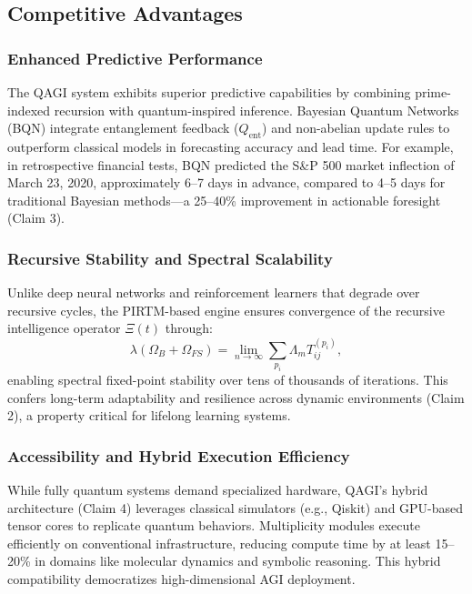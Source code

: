 \documentclass{article}
\theoremstyle{plain}
\theoremstyle{claimstyle}
\begin{document}
\subsection{Competitive Advantages}

\subsubsection{Enhanced Predictive Performance}

The QAGI system exhibits superior predictive capabilities by combining prime-indexed recursion with quantum-inspired inference. Bayesian Quantum Networks (BQN) integrate entanglement feedback ($Q_{\text{ent}}$) and non-abelian update rules to outperform classical models in forecasting accuracy and lead time. For example, in retrospective financial tests, BQN predicted the S\&P 500 market inflection of March 23, 2020, approximately 6–7 days in advance, compared to 4–5 days for traditional Bayesian methods—a 25–40\% improvement in actionable foresight (Claim 3).

\subsubsection{Recursive Stability and Spectral Scalability}

Unlike deep neural networks and reinforcement learners that degrade over recursive cycles, the PIRTM-based engine ensures convergence of the recursive intelligence operator $\Xi(t)$ through:
\[
\lambda(\Omega_B + \Omega_{FS}) = \lim_{n \to \infty} \sum_{p_i} \Lambda_m T_{ij}^{(p_i)},
\]
enabling spectral fixed-point stability over tens of thousands of iterations. This confers long-term adaptability and resilience across dynamic environments (Claim 2), a property critical for lifelong learning systems.

\subsubsection{Accessibility and Hybrid Execution Efficiency}

While fully quantum systems demand specialized hardware, QAGI’s hybrid architecture (Claim 4) leverages classical simulators (e.g., Qiskit) and GPU-based tensor cores to replicate quantum behaviors. Multiplicity modules execute efficiently on conventional infrastructure, reducing compute time by at least 15–20\% in domains like molecular dynamics and symbolic reasoning. This hybrid compatibility democratizes high-dimensional AGI deployment.
\end{document}
